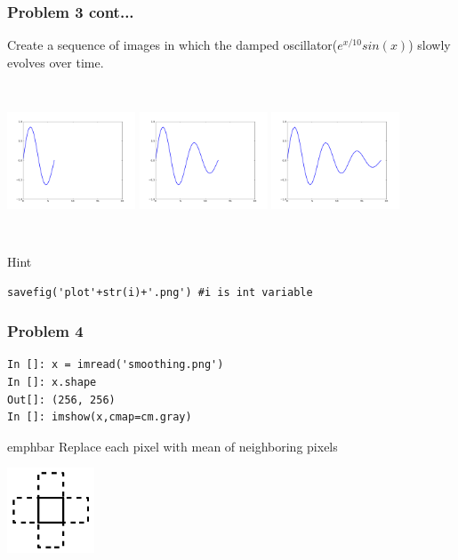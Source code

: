 \documentclass[14pt,compress]{beamer}
\newcommand{\emphbar}[1]
{\begin{beamercolorbox}[rounded=true]{emphbar} 
      {#1}
 \end{beamercolorbox}
}
\newcounter{time}
\begin{document}
\begin{frame}[fragile]
  \frametitle{Problem 3 cont...}
Create a sequence of images in which the damped oscillator($e^{x/10}sin(x)$) slowly evolves over time.
\begin{columns}
\includegraphics[width=1.5in,height=1.5in, interpolate=true]{data/plot2}
\includegraphics[width=1.5in,height=1.5in, interpolate=true]{data/plot4}
\includegraphics[width=1.5in,height=1.5in, interpolate=true]{data/plot6}
\end{columns}
\begin{block}{Hint}
\small
  \begin{lstlisting}
savefig('plot'+str(i)+'.png') #i is int variable  
  \end{lstlisting}  
\end{block}
\end{frame}

\begin{frame}[fragile]
  \frametitle{Problem 4}
  \begin{lstlisting}
In []: x = imread('smoothing.png')
In []: x.shape
Out[]: (256, 256)
In []: imshow(x,cmap=cm.gray)
  \end{lstlisting}
\emphbar{Replace each pixel with mean of neighboring pixels}
  \begin{center}
  \includegraphics[height=1in, interpolate=true]{data/neighbour}
  \end{center}
\end{frame}
\end{document}
